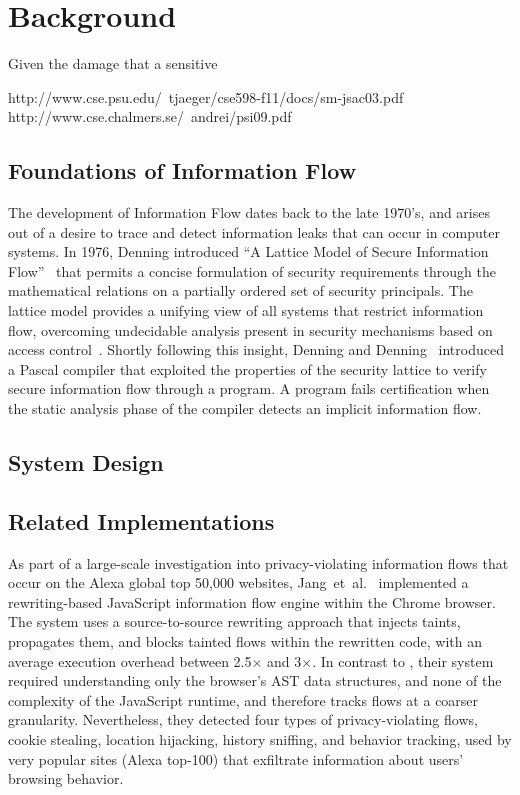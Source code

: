 
\chapter{Background}

Given the damage that a sensitive 

http://www.cse.psu.edu/~tjaeger/cse598-f11/docs/sm-jsac03.pdf
http://www.cse.chalmers.se/~andrei/psi09.pdf


\section{Foundations of Information Flow}

The development of Information Flow dates back to the late 1970's, and arises out of a desire to trace and detect information leaks that can occur in computer systems.
In 1976, Denning introduced ``A Lattice Model of Secure Information Flow''~\cite{denning+76} that permits a concise formulation of security requirements through the mathematical relations on a partially ordered set of security principals.
The lattice model provides a unifying view of all systems that restrict information flow, overcoming undecidable analysis present in security mechanisms based on access control~\cite{lampson+74}.
Shortly following this insight, Denning and Denning~\cite{denning.denning+77} introduced a Pascal compiler that exploited the properties of the security lattice to verify secure information flow through a program.
A program fails certification when the static analysis phase of the compiler detects an implicit information flow.




\section{System Design}


\section{Related Implementations}\label{sec:related-work}

As part of a large-scale investigation into privacy-violating information flows that occur on the Alexa global top 50,000 websites, Jang~et~al.~\cite{jang.etal+10} implemented a rewriting-based JavaScript information flow engine within the Chrome browser.
The system uses a source-to-source rewriting approach that injects taints, propagates them, and blocks tainted flows within the rewritten code, with an average execution overhead between 2.5$\times$ and 3$\times$.
In contrast to \FlowCore, their system required understanding only the browser's AST data structures, and none of the complexity of the JavaScript runtime, and therefore tracks flows at a coarser granularity.
Nevertheless, they detected four types of privacy-violating flows, cookie stealing, location hijacking, history sniffing, and behavior tracking, used by very popular sites (Alexa top-100) that exfiltrate information about users' browsing behavior.

